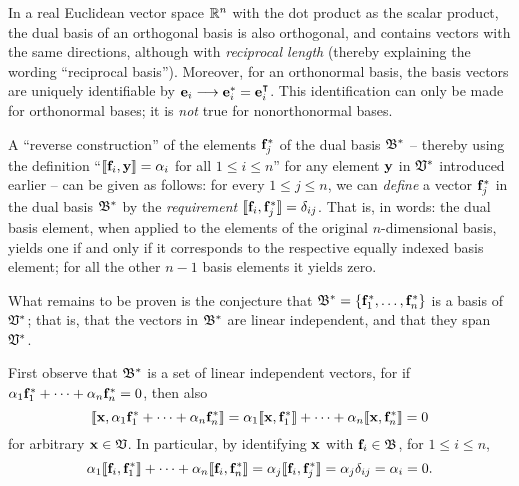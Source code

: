 In a real Euclidean vector space ${\Bbb R}^n$
with the dot product as the scalar product,
the dual basis of an orthogonal basis  is also orthogonal, and contains vectors with the same directions,
although with {\em reciprocal length} (thereby explaining the wording ``reciprocal basis'').
Moreover, for an orthonormal basis, the basis vectors are uniquely identifiable by
${\bf e}_i \longrightarrow {\bf e}_i^* = {\bf e}_i^\intercal $.
This identification can only be made for orthonormal bases; it is {\em not} true for nonorthonormal bases.



A ``reverse construction'' of the elements ${\bf f}_j^\ast $ of the dual basis ${\frak B}^\ast $
-- thereby using the definition ``$\llbracket {\bf f}_i,{\bf y}\rrbracket  = \alpha_i$
for all $1 \le i \le n$''
for any element ${\bf y}$ in ${\frak V}^\ast $ introduced earlier
--
can be given as follows:
for every $1\le j \le n$,
we can {\em define} a vector ${\bf f}_j^\ast $ in the dual basis ${\frak B}^\ast $
by the {\em requirement}   $\llbracket {\bf f}_i,{\bf f}_j^\ast \rrbracket  = \delta_{ij}$.
That is, in words:
the dual basis element, when applied to the elements of the original $n$-dimensional basis,
yields one if and only if  it corresponds to the respective equally indexed basis element;
for all the other $n-1$ basis elements it yields zero.

What remains to be proven is the conjecture that
${\frak B}^\ast  = \{{\bf f}_1^\ast ,\ldots , {\bf f}_n^\ast \}$
is a basis of ${\frak V}^\ast $; that is, that the vectors in ${\frak B}^\ast $ are linear independent,
and that they span ${\frak V}^\ast $.

First observe that ${\frak B}^\ast $ is a set of linear independent vectors,
for if
$ \alpha_1 {\bf f}_1^\ast  + \cdots + \alpha_n {\bf f}_n^\ast =0$, then also
\begin{equation}
 \llbracket {\bf x},\alpha_1 {\bf f}_1^\ast  + \cdots + \alpha_n {\bf f}_n^\ast \rrbracket =
 \alpha_1 \llbracket {\bf x},{\bf f}_1^\ast \rrbracket  + \cdots + \alpha_n \llbracket {\bf x},{\bf f}_n^\ast \rrbracket =
0
\end{equation}
for arbitrary ${\bf x}\in {\frak V}$.
In particular, by identifying ${\bf x}$ with ${\bf f}_i \in {\frak B}$, for $1 \le i \le n$,
\begin{equation}
 \alpha_1 \llbracket {\bf f}_i,{\bf f}_1^\ast \rrbracket  + \cdots + \alpha_n \llbracket {\bf f}_i,{\bf f}_n^\ast \rrbracket = \alpha_j \llbracket {\bf f}_i,{\bf f}_j^\ast \rrbracket  = \alpha_j \delta_{ij} = \alpha_i=
0.
\end{equation}

